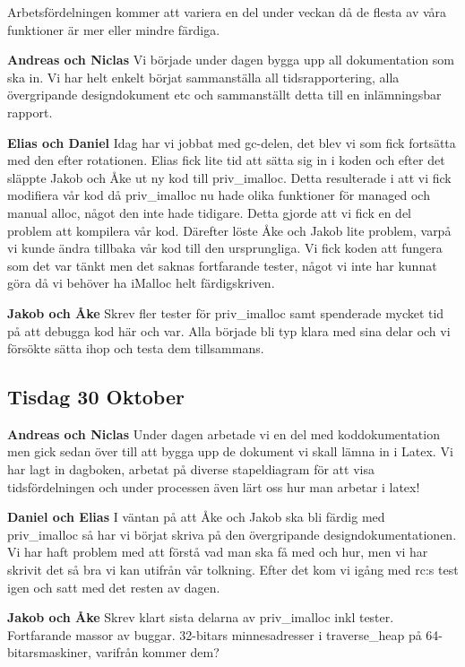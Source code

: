 \documentclass{article}
\begin{document}
Arbetsfördelningen kommer att variera en del under veckan då de flesta av våra funktioner är mer eller mindre färdiga.

{\bf Andreas och Niclas} Vi började under dagen bygga upp all dokumentation som ska in. Vi har helt enkelt börjat sammanställa all tidsrapportering, alla övergripande designdokument etc och sammanställt detta till en inlämningsbar rapport.

{\bf Elias och Daniel} Idag har vi jobbat med gc-delen, det blev vi som fick fortsätta med den efter rotationen. Elias fick lite tid att sätta sig in i koden och efter det släppte Jakob och Åke ut ny kod till priv\_imalloc. Detta resulterade i att vi fick modifiera vår kod då priv\_imalloc nu hade olika funktioner för managed och manual alloc, något den inte hade tidigare. Detta gjorde att vi fick en del problem att kompilera vår kod. Därefter löste Åke och Jakob lite problem, varpå vi kunde ändra tillbaka vår kod till den ursprungliga. Vi fick koden att fungera som det var tänkt men det saknas fortfarande tester, något vi inte har kunnat göra då vi behöver ha iMalloc helt färdigskriven.

{\bf Jakob och Åke}
Skrev fler tester för priv\_imalloc samt spenderade mycket tid på att debugga kod här och var. Alla började bli typ klara med sina delar och vi försökte sätta ihop och testa dem tillsammans.

\subsection{Tisdag 30 Oktober}

{\bf Andreas och Niclas}
Under dagen arbetade vi en del med koddokumentation men gick sedan över till att bygga upp de dokument vi skall lämna in i Latex. Vi har lagt in dagboken, arbetat på diverse stapeldiagram för att visa tidsfördelningen och under processen även lärt oss hur man arbetar i latex!

{\bf Daniel och Elias}
I väntan på att Åke och Jakob ska bli färdig med priv\_imalloc så har vi börjat skriva på den övergripande designdokumentationen. Vi har haft problem med att förstå vad man ska få med och hur, men vi har skrivit det så bra vi kan utifrån vår tolkning. Efter det kom vi igång med rc:s test igen och satt med det resten av dagen.

{\bf Jakob och Åke}
Skrev klart sista delarna av priv\_imalloc inkl tester. Fortfarande massor av buggar. 32-bitars minnesadresser i traverse\_heap på 64-bitarsmaskiner, varifrån kommer dem?
\end{document}
